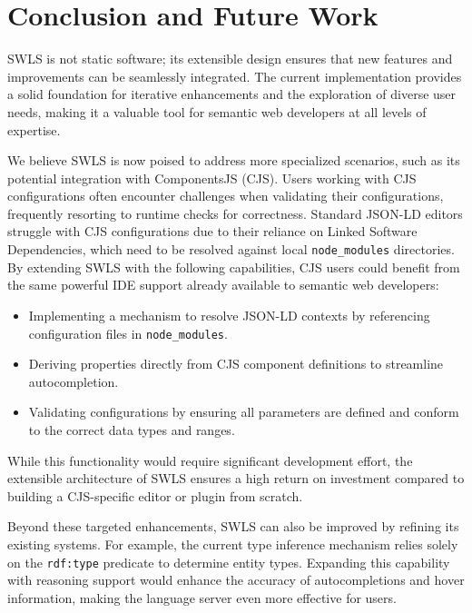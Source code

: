 \section{Conclusion and Future Work}%
\label{sec:conclusion}

SWLS is not static software; its extensible design ensures that new features and improvements can be seamlessly integrated.
The current implementation provides a solid foundation for iterative enhancements and the exploration of diverse user needs, making it a valuable tool for semantic web developers at all levels of expertise.

We believe SWLS is now poised to address more specialized scenarios, such as its potential integration with ComponentsJS (CJS).
Users working with CJS configurations often encounter challenges when validating their configurations, frequently resorting to runtime checks for correctness\cite{01GPAWNQ5ZS2DAY0J9JMPQHM9C}.
Standard JSON-LD editors struggle with CJS configurations due to their reliance on Linked Software Dependencies\cite{CJS2}, which need to be resolved against local \texttt{node\_modules} directories.
By extending SWLS with the following capabilities, CJS users could benefit from the same powerful IDE support already available to semantic web developers:

\begin{itemize}
    \item Implementing a mechanism to resolve JSON-LD contexts by referencing configuration files in \texttt{node\_modules}.
    \item Deriving properties directly from CJS component definitions to streamline autocompletion.
    \item Validating configurations by ensuring all parameters are defined and conform to the correct data types and ranges.
\end{itemize}

While this functionality would require significant development effort, 
the extensible architecture of SWLS ensures a high return on investment compared to building a CJS-specific editor or plugin from scratch.

Beyond these targeted enhancements, SWLS can also be improved by refining its existing systems.
For example, the current type inference mechanism relies solely on the \texttt{rdf:type} predicate to determine entity types.
Expanding this capability with reasoning support would enhance the accuracy of autocompletions and hover information, making the language server even more effective for users.

